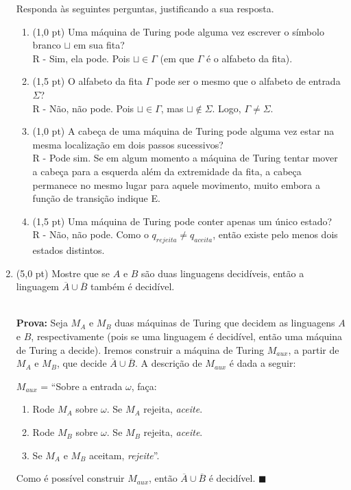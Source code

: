 \documentclass[12pt,a4paper,oneside]{article}
\begin{document}
\begin{enumerate}
	 Responda às seguintes perguntas, justificando a sua resposta.
	\begin{enumerate}
		\item (1,0 pt) Uma máquina de Turing pode alguma vez escrever o símbolo branco $\sqcup$ em sua fita? \\
			{\color{verde}
				R - Sim, ela pode. Pois $\sqcup \in \Gamma$ (em que $\Gamma$ é o alfabeto da fita).
			}
		\item (1,5 pt) O alfabeto da fita $\Gamma$ pode ser o mesmo que o alfabeto de entrada $\Sigma$? \\
			{\color{verde}
				R - Não, não pode. Pois $\sqcup \in \Gamma$, mas $\sqcup \not\in \Sigma$. Logo, $\Gamma \not= \Sigma$.
			}
		\item (1,0 pt) A cabeça de uma máquina de Turing pode alguma vez estar na mesma localização em dois passos sucessivos?\\
			{\color{verde}
				R - Pode sim. Se em algum momento a máquina de Turing tentar mover a cabeça para a esquerda além da extremidade da fita, a cabeça permanece no mesmo lugar para aquele movimento, muito embora a função de transição indique E. 
			}
		\item (1,5 pt) Uma máquina de Turing pode conter apenas um único estado?\\
			{\color{verde}
				R - Não, não pode. Como o $q_{rejeita} \not= q_{aceita}$, então existe pelo menos dois estados distintos.
			}
	\end{enumerate}
	
	\item (5,0 pt) Mostre que se $A$ e $B$ são duas linguagens decidíveis, então a linguagem $\overline{A} \cup \overline{B}$ também é decidível.\\
			\\{\color{verde}	
				{\bf Prova:} Seja $M_A$ e $M_B$ duas máquinas de Turing que decidem as linguagens $A$ e $B$, respectivamente (pois se uma linguagem é decidível, então uma máquina de Turing a decide). Iremos construir a máquina de Turing $M_{aux}$, a partir de $M_A$ e $M_B$, que decide $\overline{A} \cup \overline{B}$. A descrição de $M_{aux}$ é dada a seguir:
			
			$M_{aux}$ = ``Sobre a entrada $\omega$, faça:
			\begin{enumerate}
				\item Rode $M_A$ sobre $\omega$. Se $M_A$ rejeita, {\it aceite}.
				\item Rode $M_B$ sobre $\omega$. Se $M_B$ rejeita, {\it aceite}.
				\item Se $M_A$ e $M_B$ aceitam, {\it rejeite}''.
			\end{enumerate}
			
			Como é possível construir $M_{aux}$, então $\overline{A} \cup \overline{B}$ é decidível. $\blacksquare$
			}

\end{enumerate}
\end{document}
